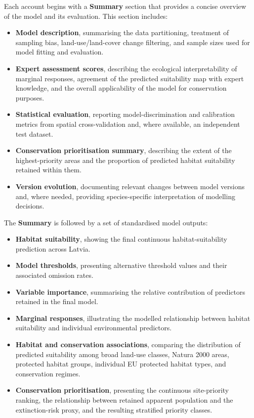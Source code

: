 \documentclass[
  openany]{book}
\begin{document}
Each account begins with a \textbf{Summary} section that provides a concise overview
of the model and its evaluation. This section includes:

\begin{itemize}
\item
  \textbf{Model description}, summarising the data partitioning, treatment of
  sampling bias, land-use/land-cover change filtering, and sample sizes used for
  model fitting and evaluation.
\item
  \textbf{Expert assessment scores}, describing the ecological interpretability of
  marginal responses, agreement of the predicted suitability map with expert
  knowledge, and the overall applicability of the model for conservation purposes.
\item
  \textbf{Statistical evaluation}, reporting model-discrimination and calibration
  metrics from spatial cross-validation and, where available, an independent test dataset.
\item
  \textbf{Conservation prioritisation summary}, describing the extent of the
  highest-priority areas and the proportion of predicted habitat suitability
  retained within them.
\item
  \textbf{Version evolution}, documenting relevant changes between model versions
  and, where needed, providing species-specific interpretation of modelling decisions.
\end{itemize}

The \textbf{Summary} is followed by a set of standardised model outputs:

\begin{itemize}
\item
  \textbf{Habitat suitability}, showing the final continuous habitat-suitability
  prediction across Latvia.
\item
  \textbf{Model thresholds}, presenting alternative threshold values and their
  associated omission rates.
\item
  \textbf{Variable importance}, summarising the relative contribution of predictors
  retained in the final model.
\item
  \textbf{Marginal responses}, illustrating the modelled relationship between habitat
  suitability and individual environmental predictors.
\item
  \textbf{Habitat and conservation associations}, comparing the distribution of
  predicted suitability among broad land-use classes, Natura 2000 areas, protected
  habitat groups, individual EU protected habitat types, and conservation regimes.
\item
  \textbf{Conservation prioritisation}, presenting the continuous site-priority
  ranking, the relationship between retained apparent population and the
  extinction-risk proxy, and the resulting stratified priority classes.
\end{itemize}
\end{document}

